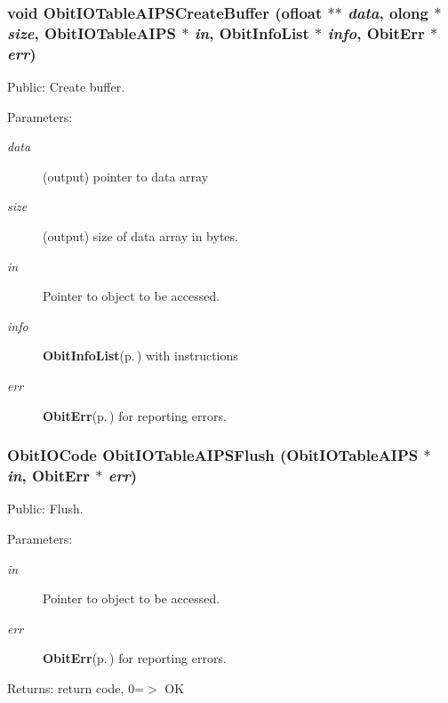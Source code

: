 \subsubsection{\setlength{\rightskip}{0pt plus 5cm}void Obit\-IOTable\-AIPSCreate\-Buffer ({\bf ofloat} $\ast$$\ast$ {\em data}, {\bf olong} $\ast$ {\em size}, {\bf Obit\-IOTable\-AIPS} $\ast$ {\em in}, {\bf Obit\-Info\-List} $\ast$ {\em info}, {\bf Obit\-Err} $\ast$ {\em err})}\label{ObitIOTableAIPS_8c_a26}


Public: Create buffer. 

\begin{Desc}
\item[Parameters:]
\begin{description}
\item[{\em data}](output) pointer to data array \item[{\em size}](output) size of data array in bytes. \item[{\em in}]Pointer to object to be accessed. \item[{\em info}]{\bf Obit\-Info\-List}{\rm (p.\,\pageref{structObitInfoList})} with instructions \item[{\em err}]{\bf Obit\-Err}{\rm (p.\,\pageref{structObitErr})} for reporting errors. \end{description}
\end{Desc}
\subsubsection{\setlength{\rightskip}{0pt plus 5cm}Obit\-IOCode Obit\-IOTable\-AIPSFlush ({\bf Obit\-IOTable\-AIPS} $\ast$ {\em in}, {\bf Obit\-Err} $\ast$ {\em err})}\label{ObitIOTableAIPS_8c_a25}


Public: Flush. 

\begin{Desc}
\item[Parameters:]
\begin{description}
\item[{\em in}]Pointer to object to be accessed. \item[{\em err}]{\bf Obit\-Err}{\rm (p.\,\pageref{structObitErr})} for reporting errors. \end{description}
\end{Desc}
\begin{Desc}
\item[Returns:]return code, 0=$>$ OK \end{Desc}
